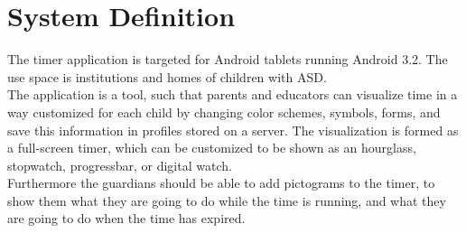 \section{System Definition}
The timer application is targeted for Android tablets running Android 3.2. The use space is institutions and homes of children with ASD.\\
   The application is a tool, such that parents and educators can visualize time in a way customized for each child by changing color schemes, symbols, forms, and save this information in profiles stored on a server. The visualization is formed as a full-screen timer, which can be customized to be shown as an hourglass, stopwatch, progressbar, or digital watch.\\
   Furthermore the guardians should be able to add pictograms to the timer, to show them what they are going to do while the time is running, and what they are going to do when the time has expired.
   
\begin{comment}   
  In addition, the timer application should be used to control the allowed time spent on other applications, such as games. When the launcher is in autist mode, the timer application should be opened as an overlay whenever another application is opened. This overlay shows how much time is left, and when the time is up, it will lock the given application with a customized cooldown. Also the timer application should include a timelock, such that other applications are only available in specific time spans.
\end{comment}